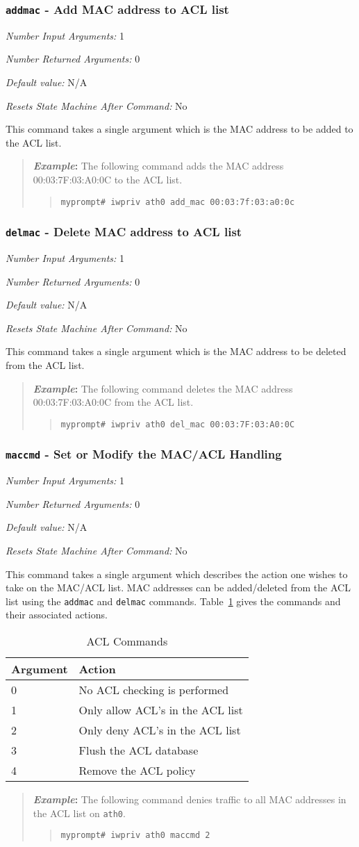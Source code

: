 \documentclass[10pt,fullpage]{article}
\newcommand{\mytt}[1]{{\texttt{#1}}}
\newcommand{\bv}{\begin{verse}}
\newcommand{\ev}{\end{verse}}
\newcommand{\cmd}[1]{{\texttt{myprompt\# #1}}}
\newcommand{\argdesc}[4]{\begin{description}
\itemsep -6pt
\item \textit{Number Input Arguments:} #1
\item \textit{Number Returned Arguments:} #2
\item \textit{Default value:} #3
\item \textit{Resets State Machine After Command:} #4
\end{description}
}
\newenvironment{example}{\begin{quote}\textbf{\textit{Example}:}}{\end{quote}}
\begin{document}
\subsubsection{\mytt{addmac} - Add MAC address to ACL list}
\argdesc{1}{0}{N/A}{No}
This command takes a single argument which is the MAC address to be
added to the ACL list.
\begin{example}
  The following command adds the MAC address 00:03:7F:03:A0:0C to the
  ACL list.
  \bv
  \cmd{iwpriv ath0 add\_mac 00:03:7f:03:a0:0c}
  \ev
\end{example}

\subsubsection{\mytt{delmac} - Delete MAC address to ACL list}
\argdesc{1}{0}{N/A}{No}
This command takes a single argument which is the MAC address to be
deleted from the ACL list.
\begin{example}
  The following command deletes the MAC address 00:03:7F:03:A0:0C from
  the ACL list.
  \bv
  \cmd{iwpriv ath0 del\_mac 00:03:7F:03:A0:0C}
  \ev
\end{example}

\subsubsection{\mytt{maccmd} - Set or Modify the MAC/ACL Handling}
\argdesc{1}{0}{N/A}{No}
This command takes a single argument which describes the action one
wishes to take on the MAC/ACL list.  MAC addresses can be
added/deleted from the ACL list using the \mytt{addmac} and
\mytt{delmac} commands.  Table~\ref{tab:maccmd} gives the commands and
their associated actions.
\begin{table}[h*]
  \centering
  \begin{tabular}{|l|l|} \hline
    Argument & Action \\ \hline
    0 & No ACL checking is performed \\
    1 & Only allow ACL's in the ACL list \\
    2 & Only deny ACL's in the ACL list \\
    3 & Flush the ACL database \\
    4 & Remove the ACL policy \\ \hline
  \end{tabular}
  \caption{ACL Commands}
  \label{tab:maccmd}
\end{table}
\begin{example}
  The following command denies traffic to all MAC addresses in the ACL
  list on \mytt{ath0}.
  \bv
  \cmd{iwpriv ath0 maccmd 2}
  \ev
\end{example}
\end{document}
